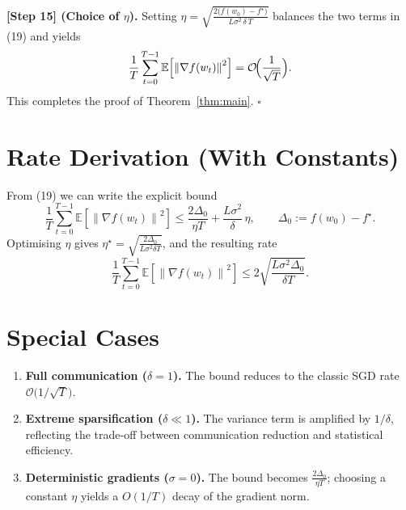 \documentclass{article}
\newcommand{\E}{\mathbb{E}}
\newcommand{\norm}[1]{\left\|#1\right\|}
\begin{document}
\noindent\textbf{[Step 15] (Choice of $\eta$).} Setting $\eta = \sqrt{\frac{2\bigl(f(w_{0})-f^{\star}\bigr)}{L\sigma^{2}\, \delta\, T}}$ balances the two terms in (19) and yields
\[
\frac{1}{T}\sum_{t=0}^{T-1}\E\!\left[\norm{\nabla f(w_{t})}^{2}\right]
= \mathcal{O}\!\Bigl(\frac{1}{\sqrt{T}}\Bigr).
\]
This completes the proof of Theorem~\ref{thm:main}. $\square$

\section*{Rate Derivation (With Constants)}
From (19) we can write the explicit bound
\[
\boxed{
\frac{1}{T}\sum_{t=0}^{T-1}\E\!\left[\norm{\nabla f(w_{t})}^{2}\right]
\le
\frac{2\Delta_{0}}{\eta T}
+\frac{L\sigma^{2}}{\delta}\,\eta,
\qquad \Delta_{0}:=f(w_{0})-f^{\star}.
}
\]
Optimising $\eta$ gives $\eta^{\star}= \sqrt{\frac{2\Delta_{0}}{L\sigma^{2}\delta T}}$, and the resulting rate
\[
\frac{1}{T}\sum_{t=0}^{T-1}\E\!\left[\norm{\nabla f(w_{t})}^{2}\right]
\le
2\sqrt{\frac{L\sigma^{2}\Delta_{0}}{\delta T}}.
\]

\section*{Special Cases}
\begin{enumerate}
\item \textbf{Full communication ($\delta=1$).} The bound reduces to the classic SGD rate $\mathcal{O}\bigl(1/\sqrt{T}\bigr)$.
\item \textbf{Extreme sparsification ($\delta\ll1$).} The variance term is amplified by $1/\delta$, reflecting the trade‑off between communication reduction and statistical efficiency.
\item \textbf{Deterministic gradients ($\sigma=0$).} The bound becomes $\frac{2\Delta_{0}}{\eta T}$; choosing a constant $\eta$ yields a $O(1/T)$ decay of the gradient norm.
\end{enumerate}
\end{document}
